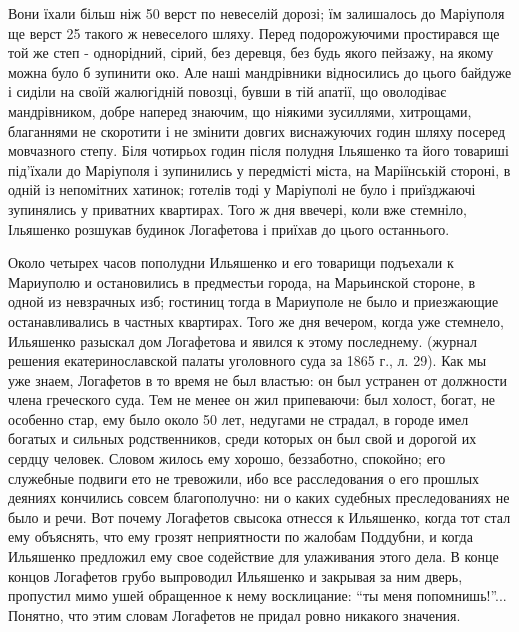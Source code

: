 \documentclass[a4paper,20pt]{report}
\begin{document}
Вони їхали більш ніж 50 верст по невеселій дорозі; їм залишалось до Маріуполя
ще верст 25 такого ж невеселого шляху.  Перед подорожуючими простирався ще той
же степ - однорідний, сірий, без деревця, без будь якого пейзажу, на якому можна було б зупинити око.
Але наші мандрівники відносились до цього байдуже і сиділи на своїй жалюгідній
повозці, бувши в тій апатії, що оволодіває мандрівником, добре наперед знаючим,
що ніякими зусиллями, хитрощами, благаннями не скоротити і не
змінити довгих виснажуючих годин шляху посеред мовчазного степу.
Біля чотирьох годин після полудня Ільяшенко та його товариші під'їхали до Маріуполя
і зупинились у передмісті міста, на Маріїнській стороні, в одній із непомітних хатинок;
готелів тоді у Маріуполі не було і приїзджаючі зупинялись у приватних квартирах. Того ж дня ввечері,
коли вже стемніло, Ільяшенко розшукав будинок Логафетова і приїхав до цього останнього.

Около четырех часов пополудни Ильяшенко и его товарищи подъехали к Мариуполю и
остановились в предместьи города, на Марьинской стороне, в одной из невзрачных
изб; гостиниц тогда в Мариуполе не было и приезжающие останавливались в
частных квартирах. Того же дня вечером, когда уже стемнело, Ильяшенко разыскал
дом Логафетова и явился к этому последнему.
(журнал решения екатеринославской палаты уголовного суда за 1865 г., л. 29). Как мы уже знаем, Логафетов в
то время не был властью: он был устранен от должности члена греческого суда. Тем не менее он жил
припеваючи: был холост, богат, не особенно стар, ему
было около 50 лет, недугами не страдал, в городе имел
богатых и сильных родственников, среди которых он
был свой и дорогой их сердцу человек. Словом жилось
ему хорошо, беззаботно, спокойно; его служебные подвиги
ето не тревожили, ибо все расследования о его прошлых деяниях 
кончились совсем благополучно: ни о каких судебных 
преследованиях не было и речи. Вот почему Логафетов свысока отнесся к Ильяшенко, когда тот стал
ему объяснять, что ему грозят неприятности по жалобам
Поддубни, и когда Ильяшенко предложил ему свое содействие для улаживания этого дела. В конце концов
Логафетов грубо выпроводил Ильяшенко и закрывая за ним 
дверь, пропустил мимо ушей обращенное к нему восклицание: ``ты меня попомнишь!''...
Понятно, что этим словам Логафетов не придал ровно никакого значения. 
\end{document}

